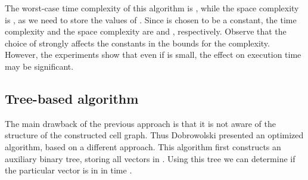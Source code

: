 \documentclass[a4paper]{article}
\begin{document}
The worst-case time complexity of this algorithm is , while the space complexity is , as we need to store the values of . Since  is chosen to be a constant, the time complexity and the space complexity are  and , respectively. 
Observe that the choice of  strongly affects the constants in the bounds for the complexity. However, the experiments show that even if  is small, the effect on execution time may be significant.


\subsection{Tree-based algorithm}

The main drawback of the previous approach is that it is not aware of the structure of the constructed cell graph. 
Thus Dobrowolski \cite{DBLP:conf/sii/Dobrowolski13} presented an optimized algorithm, based on a different approach. This algorithm first constructs an auxiliary binary tree, storing all vectors in . Using this tree we can determine if the particular vector  is in  in time .
\end{document}

